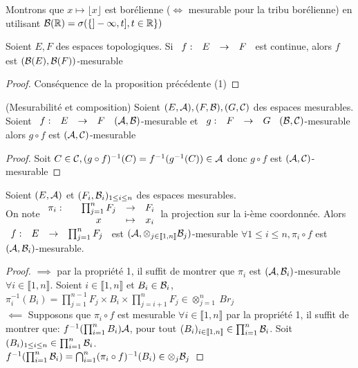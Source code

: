 \documentclass[]{report}
\begin{document}
    \begin{exo}
        Montrons que $x\mapsto \lfloor x\rfloor$ est borélienne ($\iff$ mesurable pour la tribu borélienne) en utilisant $\mathcal{B}(\mathbb{R})=\sigma(\{]-\infty,t],t\in\mathbb{R}\})$
    \end{exo}

    \begin{prop}{}{}
        Soient $E,F$ des espaces topologiques. Si $\begin{array}{ccccc} f : & E & \to & F \end{array}$ est continue, alors $f$ est $(\mathcal{B}(E),\mathcal{B}(F))$-mesurable
    \end{prop}

    \begin{proof}{}{}
        Conséquence de la proposition précédente (1)
    \end{proof}

    \begin{prop}{}{(Mesurabilité et composition)}
        Soient $(E,\mathcal{A}),(F,\mathcal{B}),(G,\mathcal{C})$ des espaces mesurables. Soient $\begin{array}{ccccc} f : & E & \to & F \end{array}$ $(\mathcal{A},\mathcal{B})$-mesurable et $\begin{array}{ccccc} g : & F & \to & G \end{array}$ $(\mathcal{B},\mathcal{C})$-mesurable alors $g\circ f$ est $(\mathcal{A},\mathcal{C})$-mesurable
    \end{prop}

    \begin{proof}{}{}
        Soit $C\in\mathcal{C},(g\circ f)^{-1}(C)=f^{-1}(g^{-1}(C))\in\mathcal{A}$ donc $g\circ f$ est $(\mathcal{A},\mathcal{C})$-mesurable
    \end{proof}

    \begin{prop}{}{}
        Soient $(E,\mathcal{A})$ et $(F_i,\mathcal{B}_i)_{1\le i\le n}$ des espaces mesurables.\\
        On note $\begin{array}{ccccc} \pi_i : & & \prod_{j=1}^{n}F_j & \to & F_i \\ & & x & \mapsto & x_i \end{array}$la projection sur la i-ème coordonnée. Alors $\begin{array}{ccccc} f : & E & \to & \prod_{j=1}^{n}F_j \end{array}$ est $(\mathcal{A},\otimes_{j\in\llbracket 1,n\rrbracket}\mathcal{B}_j)$-mesurable \ssi $\forall 1\le i\le n,\pi_i\circ f$ est $(\mathcal{A},\mathcal{B}_i)$-mesurable.
    \end{prop}

    \begin{proof}{}{}
        $\implies$ par la propriété 1, il suffit de montrer que $\pi_i$ est $(\mathcal{A},\mathcal{B}_i)$-mesurable $\forall i\in \llbracket 1,n\rrbracket$. Soient $i\in \llbracket 1,n\rrbracket$ et $B_i\in\mathcal{B}_i$, $\pi_i^{-1}(B_i)=\prod_{j=1}^{n-1}F_j\times B_i\times \prod_{j=i+1}^{n}F_j\in\otimes_{j=1}^n\ Br_j$\\
        $\impliedby$ Supposons que $\pi_i\circ f$ est mesurable $\forall i\in \llbracket 1,n\rrbracket$ par la propriété 1, il suffit de montrer que: $f^{-1}(\prod_{i=1}^{n} B_i)\mathcal{A}$, pour tout $(B_i)_{i\in\llbracket 1,n \rrbracket}\in \prod_{i=1}^{n}\mathcal{B}_i$. Soit $(B_i)_{1\le i\le n}\in \prod_{i=1}^{n}\mathcal{B}_i$.\\
        $f^{-1}(\prod_{i=1}^{n}\mathcal{B}_i)=\bigcap_{i=1}^n(\pi_i\circ f)^{-1}(B_i)\in\otimes_j \mathcal{B}_j$
    \end{proof}
\end{document}

